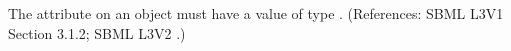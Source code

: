 The attribute  on an \Event object
must have a value of type .  (References: SBML L3V1 Section 3.1.2; SBML L3V2
.)
